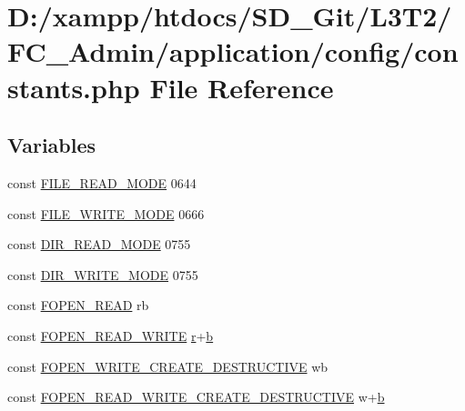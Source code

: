\hypertarget{constants_8php}{}\section{D\+:/xampp/htdocs/\+S\+D\+\_\+\+Git/\+L3\+T2/\+F\+C\+\_\+\+Admin/application/config/constants.php File Reference}
\label{constants_8php}
\subsection*{Variables}
\begin{DoxyCompactItemize}
\item 
const \hyperlink{constants_8php_afa80a675a7a8436c2b299e41c63fd405}{F\+I\+L\+E\+\_\+\+R\+E\+A\+D\+\_\+\+M\+O\+D\+E} 0644
\item 
const \hyperlink{constants_8php_a6b9fcdc9259bf9361e8f97e289024242}{F\+I\+L\+E\+\_\+\+W\+R\+I\+T\+E\+\_\+\+M\+O\+D\+E} 0666
\item 
const \hyperlink{constants_8php_a5eb43292f0c56482a7869db8adb1c91d}{D\+I\+R\+\_\+\+R\+E\+A\+D\+\_\+\+M\+O\+D\+E} 0755
\item 
const \hyperlink{constants_8php_aac7345ea170768d48be7cde8ebf6b147}{D\+I\+R\+\_\+\+W\+R\+I\+T\+E\+\_\+\+M\+O\+D\+E} 0755
\item 
const \hyperlink{constants_8php_ab6a0a1c6e9ea5f7625b2dba2f7bd286c}{F\+O\+P\+E\+N\+\_\+\+R\+E\+A\+D} \textquotesingle{}rb\textquotesingle{}
\item 
const \hyperlink{constants_8php_ab98552969950ea978284c998e10d0153}{F\+O\+P\+E\+N\+\_\+\+R\+E\+A\+D\+\_\+\+W\+R\+I\+T\+E} \textquotesingle{}\hyperlink{assets_2js_2jquery-1_811_82_8min_8js_a96f65b399314d93896076ceb474b6b9b}{r}+\hyperlink{assets_2js_2bootstrap_8min_8js_a398bb8542498d1b14178b02b99df309b}{b}\textquotesingle{}
\item 
const \hyperlink{constants_8php_a246692af603ceac463cab532d81a6048}{F\+O\+P\+E\+N\+\_\+\+W\+R\+I\+T\+E\+\_\+\+C\+R\+E\+A\+T\+E\+\_\+\+D\+E\+S\+T\+R\+U\+C\+T\+I\+V\+E} \textquotesingle{}wb\textquotesingle{}
\item 
const \hyperlink{constants_8php_a1b8581dfce24061e847cc257aed23d62}{F\+O\+P\+E\+N\+\_\+\+R\+E\+A\+D\+\_\+\+W\+R\+I\+T\+E\+\_\+\+C\+R\+E\+A\+T\+E\+\_\+\+D\+E\+S\+T\+R\+U\+C\+T\+I\+V\+E} \textquotesingle{}w+\hyperlink{assets_2js_2bootstrap_8min_8js_a398bb8542498d1b14178b02b99df309b}{b}\textquotesingle{}

\end{DoxyCompactItemize}
